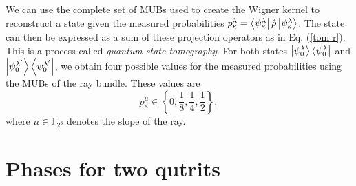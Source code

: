\documentclass[a4paper]{article}
\begin{document}
  We can use the complete set of MUBs used to create the
  Wigner kernel to reconstruct a state given the measured
  probabilities $p_{\kappa}^{\lambda} =
  \bra{\psi_\kappa^\lambda}\hat\rho\ket{\psi_\kappa^\lambda}$.
  The state can then be expressed as a sum of these
  projection operators as in Eq. (\ref{tom r}). This is a
  process called \textit{quantum state tomography}. For both
  states $\ket{\psi_0^{\lambda}}\bra{\psi_0^{\lambda}}$ and
  $\ket{\psi_0^{\lambda'}}\bra{\psi_0^{\lambda'}}$, we
  obtain four possible values for the measured probabilities
  using the MUBs of the ray bundle. These values are
  \begin{equation}
    p_\kappa^\mu
    \in 
    \left\{
      0, \frac{1}{8}, \frac{1}{4}, \frac{1}{2}
    \right\},
  \end{equation}
  where $\mu \in \mathbb F_{2^3}$ denotes the slope of the
  ray.
   


  \section{Phases for two qutrits}
\end{document}
